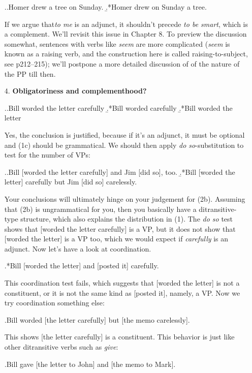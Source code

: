 \documentclass[a4paper,12pt]{article}
\begin{document}
\begin{enumerate}
		\ex.\a.Homer drew a tree on Sunday.
        	\b.*Homer drew on Sunday a tree.

		If we argue that\textit{to me} is an adjunct, it shouldn't precede \textit{to be smart}, which is a complement. We'll revisit this issue in Chapter 8. To preview the discussion somewhat, sentences with verbs like \textit{seem} are more complicated (\textit{seem} is known as a raising verb, and the construction here is called raising-to-subject, see p212--215); we'll postpone a more detailed discussion of of the nature of the PP till then.

\newpage
    \item[4.]\textbf{Obligatoriness and complementhood?}
    \setcounter{ExNo}{0}
    	
        \ex.\a.Bill worded the letter carefully
        	\b.*Bill worded carefully
            \b.*Bill worded the letter

        Yes, the conclusion is justified, because if it's an adjunct, it must be optional and (1c) should be grammatical. We should then apply \textit{do so}-substitution to test for the number of VPs:

        \ex.\a.Bill [worded the letter carefully] and Jim [did so], too.
        	\b.*Bill [worded the letter] carefully but Jim [did so] carelessly.

        Your conclusions will ultimately hinge on your judgement for (2b). Assuming that (2b) is ungrammatical for you, then you basically have a ditransitive-type structure,  which also explains the distribution in (1). The \textit{do so} test shows that [worded the letter carefully] is a VP, but it does not show that [worded the letter] is a VP too, which we would expect if \textit{carefully} is an adjunct. Now let's have a look at coordination.

        \ex.*Bill [worded the letter] and [posted it] carefully.

        This coordination test fails, which suggests that [worded the letter] is not a constituent, or it is not the same kind as [posted it], namely, a VP. Now we try coordination something else:

        \ex.Bill worded [the letter carefully] but [the memo carelessly].

        This shows [the letter carefully] is a constituent. This behavior is just like other ditransitive verbs such as \textit{give}:

        \ex.Bill gave [the letter to John] and [the memo to Mark].


\end{enumerate}
\end{document}
